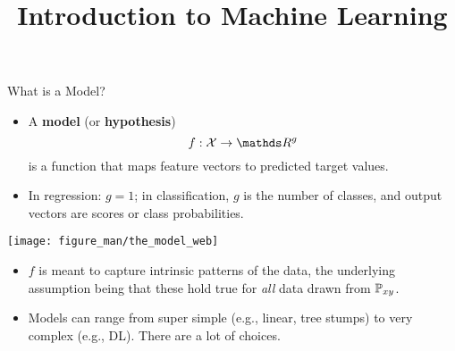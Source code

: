 \documentclass[11pt,compress,t,notes=noshow, xcolor=table]{beamer}
\title{Introduction to Machine Learning}
\begin{document}



\begin{vbframe}{What is a Model?}
  
  \begin{itemize}
    
    \item A \textbf{model} (or \textbf{hypothesis}) 
    $$f : \Xspace \rightarrow \R^g$$ 
    is a function that maps feature vectors to predicted target values.
    
    \item In regression: $g = 1$; in  
    classification, $g$ is the number of classes, and output vectors are scores 
    or class probabilities. %
    
    
  \end{itemize}
  
  \begin{center}
    \texttt{[image: figure\_man/the\_model\_web]} 
  \end{center}
  
  
  \framebreak
  
  \begin{itemize}
    
    \item $f$ is meant to capture intrinsic patterns of the data, the
    underlying assumption being that these hold true for \emph{all} data drawn 
    from $\mathbb{P}_{xy}$.
    
    \item Models can range from super simple (e.g., 
    linear, tree stumps) to very complex (e.g., DL). There are a lot of choices. 
    

\end{itemize}
\end{vbframe}
\end{document}
